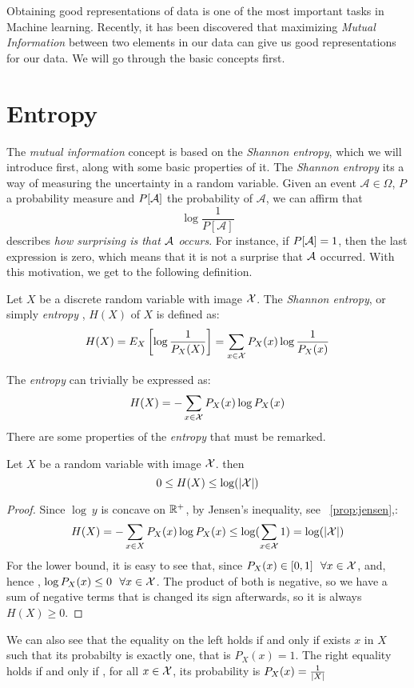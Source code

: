 Obtaining good representations of data is one of the most important tasks in Machine learning. 
Recently, it has been discovered that maximizing \emph{Mutual Information} between two elements in our data can give us good representations for our data. We will go through the basic concepts first.


\section{Entropy}

The \emph{mutual information} concept is based on the \emph{Shannon entropy}, which we will introduce first, along with some basic properties of it. The \emph{Shannon entropy} its a way of measuring the uncertainty in a random variable. Given an event $\mathcal A \in \Omega$, $P$ a probability measure and $P[\mathcal A]$ the probability of $\mathcal A$, we can affirm that 
$$
\log\frac{1}{P[\mathcal A]}
$$
describes \emph{how surprising is that $\mathcal A$ occurs}. For instance, if $P[\mathcal A] = 1$, then the last expression is zero, which means that it is not a surprise that $\mathcal A$ occurred. With this motivation, we get to the following definition.


\begin{ndef}
Let $X$ be a discrete random variable with image $\mathcal{X}$. The \emph{Shannon entropy}, or simply \emph{entropy} , $H(X)$ of $X$ is defined as:
$$
H(X) = E_X\left[\log\frac{1}{P_X(X)}\right] =  \sum_{x \in \mathcal{X}} P_X(x) \log\frac{1}{P_X(x)}
$$
\end{ndef}
The \emph{entropy} can trivially be expressed as:
$$
H(X) = - \sum_{x \in \mathcal{X}}P_X (x)\log P_X(x)
$$
There are some properties of the \emph{entropy} that must be remarked. 
\begin{nprop}\label{entr:prop:1}
    Let $X$ be a random variable with image $\mathcal{X}$. then
    $$
0 \leq H(X) \leq \log(|\mathcal{X}|)
    $$
\end{nprop}
\begin{proof}
    Since $\log \ y$ is concave on $\mathbb{R}^+$, by Jensen's inequality, see ~\ref{prop:jensen},:
    $$
    H(X) = - \sum_{x \in X}P_X (x)\log P_X(x) \leq \log(\sum_{x \in \mathcal{X}} 1) = \log(|\mathcal{X}|)
    $$
    For the lower bound, it is easy to see that, since $P_X(x) \in [0,1] \ \  \forall x \in \X $, and, hence , $\log P_X(x) \leq 0 \ \ \forall x \in \mathcal{X}$. The product of both is negative, so we have a sum of negative terms that is changed its sign afterwards, so it is always $H(X) \geq 0$. 
\end{proof}
We can also see that the equality on the left holds if and only if exists $ x $ in  $X$ such that its probabilty is exactly one, that is $P_X(x) = 1$. The right equality holds if and only if , for all $x \in \mathcal{X}$, its probability is $P_X(x) = \frac{1}{\lvert X\rvert}$

